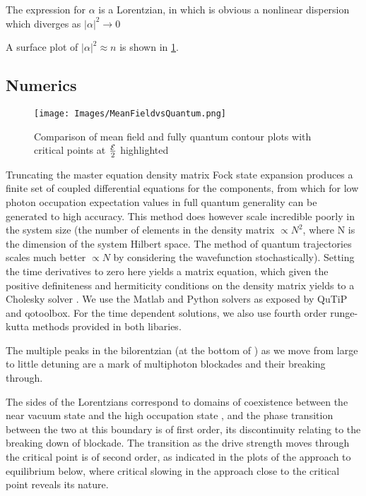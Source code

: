 The expression for $\alpha$ is a Lorentzian, in which is obvious a nonlinear dispersion which diverges as $|\alpha|^2 \rightarrow 0$

A surface plot of $|\alpha|^2 \approx n$ is shown in \ref{fig:MeanFieldvsQuantum}.
\subsection{Numerics}
\begin{figure}[ht]
 \centering
 \texttt{[image: Images/MeanFieldvsQuantum.png]}
 \caption{Comparison of mean field and fully quantum contour plots with critical points at $\frac{\mathcal{E}}{2}$ highlighted}\label{fig:MeanFieldvsQuantum}
 \end{figure}

Truncating the master equation density matrix Fock state expansion produces a finite set of coupled differential equations for the components, from which for low photon occupation expectation values in full quantum generality can be generated to high accuracy. This method does however scale incredible poorly in the system size (the number of elements in the density matrix $\propto N^2$, where N is the dimension of the system Hilbert space. The method of quantum trajectories scales much better \cite{Molmer1993} $\propto N$ by considering the wavefunction stochastically). Setting the time derivatives to zero here yields a matrix equation, which given the positive definiteness and hermiticity conditions on the density matrix yields to a Cholesky solver \cite{Press1992}. We use the Matlab and Python solvers as exposed by QuTiP \cite{Johansson2013a} and qotoolbox\cite{Tan1999a}. For the time dependent solutions, we also use fourth order runge-kutta methods provided in both libaries.

The multiple peaks in the bilorentzian (at the bottom of \autocite[Figure 1]{Carmichael2015}) as we move from large to little detuning are a mark of multiphoton blockades and their breaking through.

The sides of the Lorentzians correspond to domains of coexistence between the near vacuum state and the high occupation state \cite{Carmichael2015}, and the phase transition between the two at this boundary is of first order, its discontinuity relating to the breaking down of blockade. The transition as the drive strength moves through the critical point is of second order, as indicated in the plots of the approach to equilibrium below, where critical slowing in the approach close to the critical point reveals its nature.

